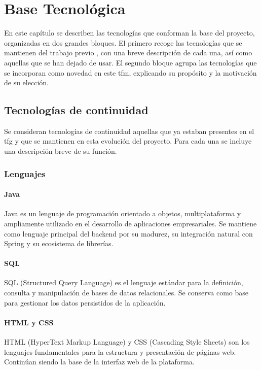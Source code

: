 \chapter{Base Tecnológica}
\label{chap:basetecnoloxica}

\lettrine{E}{}n este capítulo se describen las tecnologías que conforman la base del proyecto, organizadas en dos grandes bloques. El primero recoge las tecnologías que se mantienen del trabajo previo \cite{TFGAdrianGarcia2025}, con una breve descripción de cada una, así como aquellas que se han dejado de usar. El segundo bloque agrupa las tecnologías que se incorporan como novedad en este \acrshort{tfm}, explicando su propósito y la motivación de su elección.

\section{Tecnologías de continuidad}

Se consideran tecnologías de continuidad aquellas que ya estaban presentes en el \acrshort{tfg} y que se mantienen en esta evolución del proyecto. Para cada una se incluye una descripción breve de su función.

\subsection{Lenguajes}

\subsubsection{Java}
Java \cite{java} es un lenguaje de programación orientado a objetos, multiplataforma y ampliamente utilizado en el desarrollo de aplicaciones empresariales. Se mantiene como lenguaje principal del backend por su madurez, su integración natural con Spring y su ecosistema de librerías.

\subsubsection{SQL}
SQL (Structured Query Language) \cite{sql} es el lenguaje estándar para la definición, consulta y manipulación de bases de datos relacionales. Se conserva como base para gestionar los datos persistidos de la aplicación.

\subsubsection{HTML y CSS}
HTML (HyperText Markup Language) y CSS (Cascading Style Sheets) \cite{html_css} son los lenguajes fundamentales para la estructura y presentación de páginas web. Continúan siendo la base de la interfaz web de la plataforma.

